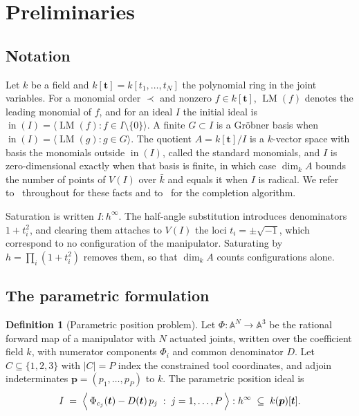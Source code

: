 \documentclass[11pt,a4paper]{article}
\theoremstyle{plain}
\theoremstyle{definition}
\newtheorem{definition}[proposition]{Definition}
\theoremstyle{remark}
\newcommand{\Aff}{\mathbb{A}}
\newcommand{\bp}{\boldsymbol{p}}
\newcommand{\bt}{\boldsymbol{t}}
\newcommand{\In}{\operatorname{in}}
\newcommand{\LM}{\operatorname{LM}}
\begin{document}
\section{Preliminaries}
\label{sec:preliminaries}

\subsection{Notation}

Let $k$ be a field and $k[\bt] = k[t_1,\dots,t_N]$ the polynomial ring in the joint variables. For a
monomial order $\prec$ and nonzero $f \in k[\bt]$, $\LM(f)$ denotes the leading monomial of $f$, and
for an ideal $I$ the initial ideal is
$\In(I) = \langle \LM(f) : f \in I \setminus \{0\} \rangle$. A finite $G \subset I$ is a Gr\"obner
basis when $\In(I) = \langle \LM(g) : g \in G\rangle$. The quotient $A = k[\bt]/I$ is a $k$-vector
space with basis the monomials outside $\In(I)$, called the standard monomials, and $I$ is
zero-dimensional exactly when that basis is finite, in which case $\dim_k A$ bounds the number of
points of $V(I)$ over $\bar{k}$ and equals it when $I$ is radical. We refer
to~\cite{coxlittleoshea} throughout for these facts and to~\cite{buchberger1965} for the completion
algorithm.

Saturation is written $I : h^\infty$. The half-angle substitution introduces denominators
$1 + t_i^2$, and clearing them attaches to $V(I)$ the loci $t_i = \pm\sqrt{-1}$, which correspond to
no configuration of the manipulator. Saturating by $h = \prod_i (1+t_i^2)$ removes them, so that
$\dim_k A$ counts configurations alone.

\subsection{The parametric formulation}

\begin{definition}[Parametric position problem]
\label{def:problem}
Let $\Phi : \Aff^N \to \Aff^3$ be the rational forward map of a manipulator with $N$ actuated joints,
written over the coefficient field $k$, with numerator components $\Phi_i$ and common denominator
$D$. Let $C \subseteq \{1,2,3\}$ with $|C| = P$ index the constrained tool coordinates, and adjoin
indeterminates $\bp = (p_1,\dots,p_P)$ to $k$. The parametric position ideal is
\[
  I \;=\; \Bigl\langle\, \Phi_{c_j}(\bt) - D(\bt)\,p_j \;:\; j = 1,\dots,P \,\Bigr\rangle : h^\infty
  \;\subseteq\; k(\bp)[\bt].
\]
\end{definition}
\end{document}
